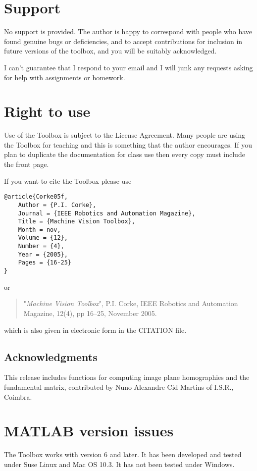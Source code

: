 \documentclass{article}
\begin{document}
{{\section{Support}
No support is provided.  The author is happy to correspond with people who have found genuine
bugs or deficiencies, and 
to accept contributions for inclusion in future versions of the
toolbox, and you will be suitably acknowledged.

I can't guarantee that I respond to your email and I will junk any
requests asking for help with assignments or homework.


\section{Right to use}
Use of the Toolbox is subject to the License Agreement.
Many people are using the Toolbox for teaching and this is something that
the author encourages.  If you plan to duplicate the documentation for class
use then every copy must include the front page.

If you want to cite the Toolbox please use
\begin{verbatim}
@article{Corke05f,
    Author = {P.I. Corke},
    Journal = {IEEE Robotics and Automation Magazine},
    Title = {Machine Vision Toolbox},
    Month = nov,
    Volume = {12},
    Number = {4},
    Year = {2005},
    Pages = {16-25}
}
\end{verbatim}
or
\begin{quote}
"\textit{Machine Vision Toolbox}", P.I. Corke, IEEE Robotics and Automation Magazine, 12(4), pp 16--25, November 2005.
\end{quote}
which is also given in electronic form in the CITATION file.

\subsection{Acknowledgments}
This release includes functions for computing image plane homographies and
the fundamental matrix, contributed by Nuno Alexandre Cid Martins of 
I.S.R., Coimbra.

\section{MATLAB version issues}
The Toolbox works with {\Mlab} version  6 and later.
It has been developed and tested under Suse Linux and Mac OS 10.3.
It has not been tested under Windows.

}}
\end{document}
